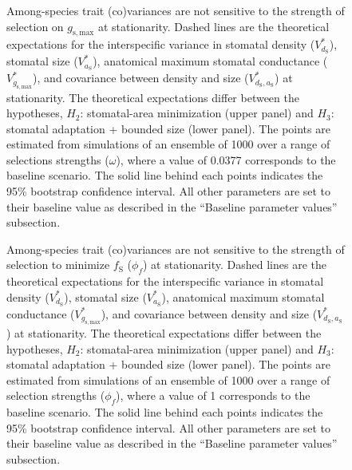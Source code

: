 \documentclass[
  letterpaper,
  DIV=11,
  numbers=noendperiod]{scrartcl}
\begin{document}
\begin{figure}
\caption{Among-species trait (co)variances are not sensitive to the strength of selection on $g_\mathrm{s,max}$ at stationarity. Dashed lines are the theoretical expectations for the interspecific variance in stomatal density ($V_{d_\mathrm{S}}^*$), stomatal size ($V_{a_\mathrm{S}}^*$), anatomical maximum stomatal conductance ($V_{g_\mathrm{s,max}}^*$), and covariance between density and size ($V_{d_\mathrm{S},a_\mathrm{S}}^*$) at stationarity. The theoretical expectations differ between the hypotheses, $H_2$: stomatal-area minimization (upper panel) and $H_3$: stomatal adaptation + bounded size (lower panel). The points are estimated from simulations of an ensemble of 1000 over a range of selections strengths ($\omega$), where a value of 0.0377 corresponds to the baseline scenario. The solid line behind each points indicates the 95\% bootstrap confidence interval. All other parameters are set to their baseline value as described in the ``Baseline parameter values'' subsection.}

\end{figure}

\newpage

\begin{figure}
\caption{Among-species trait (co)variances are not sensitive to the strength of selection to minimize $f_\mathrm{S}$ ($\phi_f$) at stationarity. Dashed lines are the theoretical expectations for the interspecific variance in stomatal density ($V_{d_\mathrm{S}}^*$), stomatal size ($V_{a_\mathrm{S}}^*$), anatomical maximum stomatal conductance ($V_{g_\mathrm{s,max}}^*$), and covariance between density and size ($V_{d_\mathrm{S},a_\mathrm{S}}^*$) at stationarity. The theoretical expectations differ between the hypotheses, $H_2$: stomatal-area minimization (upper panel) and $H_3$: stomatal adaptation + bounded size (lower panel). The points are estimated from simulations of an ensemble of 1000 over a range of selection strengths ($\phi_f$), where a value of 1 corresponds to the baseline scenario. The solid line behind each points indicates the 95\% bootstrap confidence interval. All other parameters are set to their baseline value as described in the ``Baseline parameter values'' subsection.}

\end{figure}

\newpage
\end{document}
